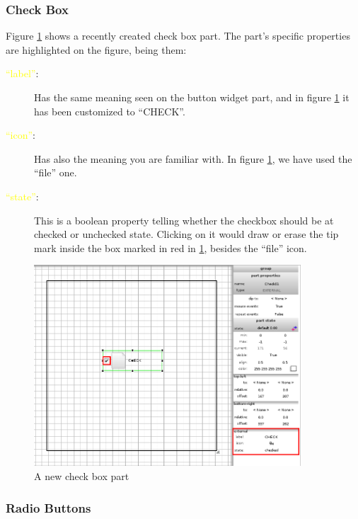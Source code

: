 \documentclass[a4paper]{profusion}
\newcommand{\GUIEditable}[1]{\textcolor{yellow}{#1}} %
\begin{document}
\subsubsection{Check Box}

Figure \ref{fig:new_checkbox} shows a recently created check box
part. The part's specific properties are highlighted on the figure,
being them:

\begin{description}
  \item[\GUIEditable{``label''}:] Has the same meaning seen on the
    button widget part, and in figure \ref{fig:new_checkbox} it has
    been customized to ``CHECK''.
  \item[\GUIEditable{``icon''}:] Has also the meaning you are familiar
    with. In figure \ref{fig:new_checkbox}, we have used the ``file''
    one.
  \item[\GUIEditable{``state''}:] This is a boolean property telling
    whether the checkbox should be at checked or unchecked
    state. Clicking on it would draw or erase the tip mark inside the
    box marked in red in \ref{fig:new_checkbox}, besides the ``file''
    icon.
\end{description}

\begin{figure}[h!]
  \centering
  \includegraphics[width=0.89\textwidth]{images/new_checkbox.png}
  \caption{A new check box part}
  \label{fig:new_checkbox}
\end{figure}

\subsubsection{Radio Buttons}
\end{document}
